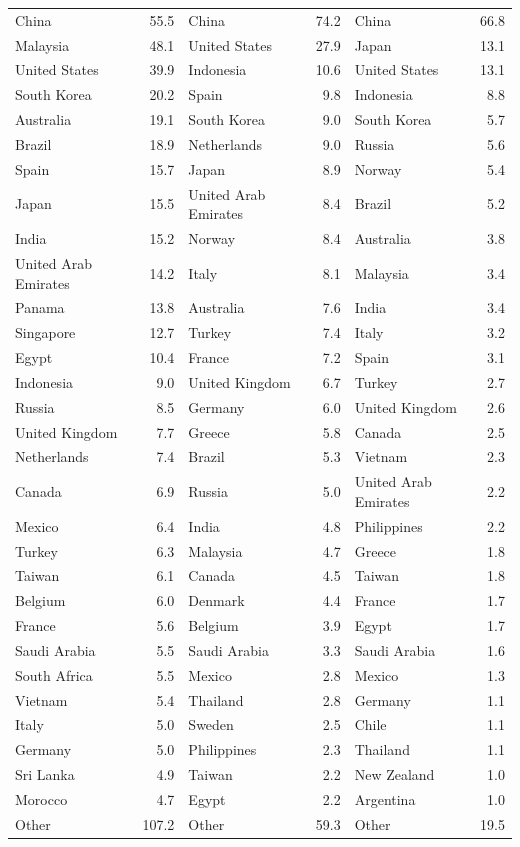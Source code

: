 \documentclass[lineno,pdflatex,sn-nature]{sn-jnl}
\providecommand{\DIFaddbegin}{} %
\providecommand{\DIFaddend}{} %
\providecommand{\DIFaddendFL}{} %
\providecommand{\DIFaddincludegraphics}[2][]{{\color{blue}\fbox{\DIFOincludegraphics[#1]{#2}}}} %
\DeclareRobustCommand{\DIFaddbegin}{\DIFOaddbegin \let\includegraphics\DIFaddincludegraphics} %
\DeclareRobustCommand{\DIFaddend}{\DIFOaddend \let\includegraphics\DIFOincludegraphics} %
\DeclareRobustCommand{\DIFaddendFL}{\DIFOaddendFL \let\includegraphics\DIFOincludegraphics} %
\begin{document}
\begin{table}[!h]
\begin{tabular}[t]{lrlrlr}
\midrule
China & 55.5 & China & 74.2 & China & 66.8\\
Malaysia & 48.1 & United States & 27.9 & Japan & 13.1\\
United States & 39.9 & Indonesia & 10.6 & United States & 13.1\\
South Korea & 20.2 & Spain & 9.8 & Indonesia & 8.8\\
Australia & 19.1 & South Korea & 9.0 & South Korea & 5.7\\
\addlinespace
Brazil & 18.9 & Netherlands & 9.0 & Russia & 5.6\\
Spain & 15.7 & Japan & 8.9 & Norway & 5.4\\
Japan & 15.5 & United Arab Emirates & 8.4 & Brazil & 5.2\\
India & 15.2 & Norway & 8.4 & Australia & 3.8\\
United Arab Emirates & 14.2 & Italy & 8.1 & Malaysia & 3.4\\
\addlinespace
Panama & 13.8 & Australia & 7.6 & India & 3.4\\
Singapore & 12.7 & Turkey & 7.4 & Italy & 3.2\\
Egypt & 10.4 & France & 7.2 & Spain & 3.1\\
Indonesia & 9.0 & United Kingdom & 6.7 & Turkey & 2.7\\
Russia & 8.5 & Germany & 6.0 & United Kingdom & 2.6\\
\addlinespace
United Kingdom & 7.7 & Greece & 5.8 & Canada & 2.5\\
Netherlands & 7.4 & Brazil & 5.3 & Vietnam & 2.3\\
Canada & 6.9 & Russia & 5.0 & United Arab Emirates & 2.2\\
Mexico & 6.4 & India & 4.8 & Philippines & 2.2\\
Turkey & 6.3 & Malaysia & 4.7 & Greece & 1.8\\
\addlinespace
Taiwan & 6.1 & Canada & 4.5 & Taiwan & 1.8\\
Belgium & 6.0 & Denmark & 4.4 & France & 1.7\\
France & 5.6 & Belgium & 3.9 & Egypt & 1.7\\
Saudi Arabia & 5.5 & Saudi Arabia & 3.3 & Saudi Arabia & 1.6\\
South Africa & 5.5 & Mexico & 2.8 & Mexico & 1.3\\
\addlinespace
Vietnam & 5.4 & Thailand & 2.8 & Germany & 1.1\\
Italy & 5.0 & Sweden & 2.5 & Chile & 1.1\\
Germany & 5.0 & Philippines & 2.3 & Thailand & 1.1\\
Sri Lanka & 4.9 & Taiwan & 2.2 & New Zealand & 1.0\\
Morocco & 4.7 & Egypt & 2.2 & Argentina & 1.0\\
\addlinespace
Other & 107.2 & Other & 59.3 & Other & 19.5\\
\bottomrule
\end{tabular}
\DIFaddendFL \end{table}
\DIFaddbegin \FloatBarrier
\DIFaddend 
\end{document}
